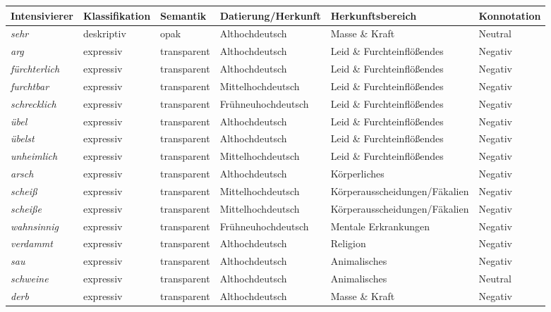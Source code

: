 \begin{table}
\small
\begin{tabular}{llllll}
\lsptoprule
Intensivierer & Klassifikation & Semantik & Datierung/Herkunft & Herkunftsbereich & Konnotation\\
\midrule
\rowcolor[gray]{.90}
\textit{sehr} & deskriptiv & opak & Althochdeutsch & Masse \& Kraft & Neutral\\ 				
\textit{arg} & expressiv & transparent & Althochdeutsch  & Leid \& Furchteinflößendes & Negativ\\
\rowcolor[gray]{.90}
\textit{fürchterlich} & expressiv & transparent & Althochdeutsch & Leid \& Furchteinflößendes & Negativ\\		
\textit{furchtbar} & expressiv & transparent & Mittelhochdeutsch & Leid \& Furchteinflößendes & Negativ\\ 
\rowcolor[gray]{.90}
\textit{schrecklich} & expressiv & transparent & Frühneuhochdeutsch & Leid \& Furchteinflößendes & Negativ\\ 
\textit{übel} & expressiv & transparent & Althochdeutsch & Leid \& Furchteinflößendes & Negativ\\	
\rowcolor[gray]{.90}			
\textit{übelst} & expressiv & transparent & Althochdeutsch & Leid \& Furchteinflößendes & Negativ\\ 
\textit{unheimlich} & expressiv & transparent & Mittelhochdeutsch & Leid \& Furchteinflößendes & Negativ\\
\rowcolor[gray]{.90}	
\textit{arsch} & expressiv & transparent & Althochdeutsch & Körperliches & Negativ\\
\textit{scheiß} & expressiv & transparent & Mittelhochdeutsch & Körperausscheidungen/Fäkalien & Negativ\\	
\rowcolor[gray]{.90}
\textit{scheiße} & expressiv & transparent & Mittelhochdeutsch & Körperausscheidungen/Fäkalien & Negativ\\ 
\textit{wahnsinnig} & expressiv & transparent & Frühneuhochdeutsch & Mentale Erkrankungen & Negativ \\ 
\rowcolor[gray]{.90}
\textit{verdammt} & expressiv & transparent & Althochdeutsch & Religion & Negativ\\	
\textit{sau} & expressiv & transparent & Althochdeutsch & Animalisches & Negativ\\ 	
\rowcolor[gray]{.90}			
\textit{schweine} & expressiv & transparent & Althochdeutsch & Animalisches & Neutral\\	
\textit{derb} & expressiv & transparent & Althochdeutsch & Masse \& Kraft & Negativ\\

\end{tabular}
\end{table}

